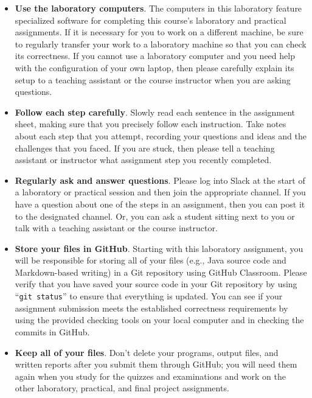 \documentclass[11pt]{article}
\newcommand{\command}[1]{``\lstinline{#1}''}
\begin{document}
\begin{itemize}
  \setlength{\itemsep}{0pt}

\item {\bf Use the laboratory computers}. The computers in this laboratory
  feature specialized software for completing this course's laboratory and
  practical assignments. If it is necessary for you to work on a different
  machine, be sure to regularly transfer your work to a laboratory machine so
  that you can check its correctness. If you cannot use a laboratory computer
  and you need help with the configuration of your own laptop, then please
  carefully explain its setup to a teaching assistant or the course instructor
  when you are asking questions.

\item {\bf Follow each step carefully}. Slowly read each sentence in the
  assignment sheet, making sure that you precisely follow each instruction.
  Take notes about each step that you attempt, recording your questions and
  ideas and the challenges that you faced. If you are stuck, then please tell a
  teaching assistant or instructor what assignment step you recently completed.

\item {\bf Regularly ask and answer questions}. Please log into Slack at the
  start of a laboratory or practical session and then join the appropriate
  channel. If you have a question about one of the steps in an assignment, then
  you can post it to the designated channel. Or, you can ask a student sitting
  next to you or talk with a teaching assistant or the course instructor.

\item {\bf Store your files in GitHub}. Starting with this laboratory
  assignment, you will be responsible for storing all of your files (e.g., Java
  source code and Markdown-based writing) in a Git repository using GitHub
  Classroom. Please verify that you have saved your source code in your Git
  repository by using \command{git status} to ensure that everything is
  updated. You can see if your assignment submission meets the established
  correctness requirements by using the provided checking tools on your local
  computer and in checking the commits in GitHub.

\item {\bf Keep all of your files}. Don't delete your programs, output files,
  and written reports after you submit them through GitHub; you will need them
  again when you study for the quizzes and examinations and work on the other
  laboratory, practical, and final project assignments.


\end{itemize}
\end{document}
